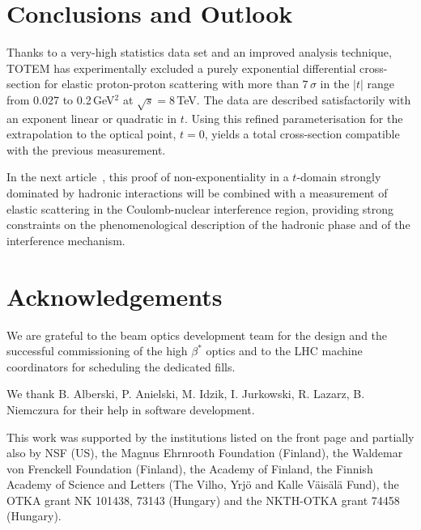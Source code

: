\documentclass[3p,twocolumn]{elsarticle}
\begin{document}







\section{Conclusions and Outlook}
%
Thanks to a very-high statistics data set and an improved analysis technique,
TOTEM has experimentally excluded a purely exponential differential 
cross-section for elastic proton-proton scattering with more than $7\,\sigma$
in the $|t|$ range from 0.027 to 0.2\,GeV$^{2}$ at $\sqrt{s}=8\,$TeV. The data
are described satisfactorily with an exponent linear or quadratic in $t$.
Using this refined parameterisation for the extrapolation to the optical point,
$t = 0$, yields a total cross-section compatible with the previous measurement.

In the next article~\cite{1km}, this proof of non-exponentiality in a 
$t$-domain strongly
dominated by hadronic interactions will be combined with a measurement of 
elastic scattering in the Coulomb-nuclear interference region, providing strong
constraints on the phenomenological description of the hadronic phase and of 
the interference mechanism.




\section*{Acknowledgements}
We are grateful to the beam optics development team for the design and the 
successful commissioning of the high $\beta^{*}$ optics and to the LHC machine 
coordinators for scheduling the dedicated fills.

We thank B. Alberski, P. Anielski, M. Idzik, I. Jurkowski, R. Lazarz, 
B. Niemczura for their help in software development.

This work was supported by the institutions listed on the front page and 
partially also by NSF (US), the Magnus Ehrnrooth Foundation (Finland), the 
Waldemar von Frenckell Foundation (Finland), the Academy of Finland, the 
Finnish Academy of Science and Letters (The Vilho, Yrj\"o and Kalle 
V\"ais\"al\"a Fund), the OTKA grant NK 101438, 73143 (Hungary) and the 
NKTH-OTKA grant 74458 (Hungary).
\end{document}
